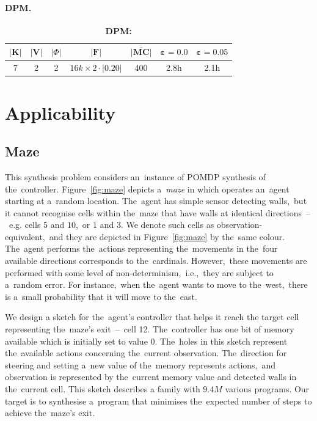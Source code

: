\paragraph{DPM.}

\begin{table}[h!]
\centering
\begin{tabular}{|c|c|c|c|c|c|c|}
\hline
$\lvert \mathbf{K} \rvert$ & $\lvert \mathbf{V} \rvert$ & $\lvert \varPhi \rvert$ & $\lvert \mathcal{\mathbf{F}} \rvert$ & $\overline{\mathbf{\lvert MC \rvert}}$ & $\mathbf{\varepsilon = 0.0}$ & $\mathbf{\varepsilon = 0.05}$ \\ \hline
7 & 2 & 2 & $16k \times 2 \cdot \lvert 0.20 \rvert$ & 400 & 2.8h & 2.1h \\ \hline
\end{tabular}
\caption{\textbf{DPM:}}
\end{table}

\section{Applicability}

\subsection{Maze} 
This synthesis problem considers an~instance of POMDP synthesis of the~controller.
Figure~\ref{fig:maze} depicts a~\emph{maze} in which operates an~agent starting at a~random location.
The~agent has simple sensor detecting walls,~but it cannot recognise cells within the~maze that have walls at identical directions \,--\,~e.g. cells $5$ and $10$,~or $1$ and $3$.
We denote such cells as observation-equivalent,~and they are depicted in Figure~\ref{fig:maze} by the~same colour.
The~agent performs the~actions representing the~movements in the~four available directions corresponds to the~cardinals.
However,~these movements are performed with some level of non-determinism,~i.e.,~they are subject to a~random error.
For instance,~when the~agent wants to move to the~west,~there is a~small probability that it will move to the~east.

We design a sketch for the~agent's controller that helps it reach the target cell representing the~maze's exit \,--\, cell 12.
The~controller has one bit of memory available which is initially set to value $0$.
The~holes in this sketch represent the~available actions concerning the~current observation.
The~direction for steering and setting a~new value of the~memory represents actions,~and observation is represented by the~current memory value and detected walls in the~current cell.
This sketch describes a family with $9.4M$ various programs.
Our target is to synthesise a~program that minimises the~expected number of steps to achieve the~maze's exit.


